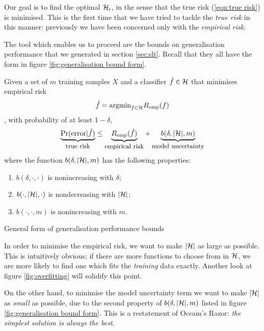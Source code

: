 Our goal is to find the optimal $\mathcal{H}_i$, in the sense that the
true risk (\ref{eqn:true risk}) is minimised.  This is the
first time that we have tried to tackle the \emph{true risk} in this manner:
previously we have been concerned only with the \emph{empirical risk}.

The tool which enables us to proceed are the bounds on generalisation
performance that we generated in section \ref{sec:slt}.  Recall that
they all have the form in figure \ref{fig:generalisation bound form}.

\begin{linefigure}
Given a set of $m$ training samples $X$ and a classifier $\hat{f} \in \mathcal{H}$
that minimises empirical risk
\begin{equation*}
\hat{f} = \mathrm{argmin}_{f \in
\mathcal{H}} R_{\mathrm{emp}}(f)
\end{equation*}
, with probability of at least $1 - \delta$,
%
\begin{equation}
\underbrace{\Pr(\mathrm{error}|\hat{f})}_{\mbox{\small{true risk}}} \leq 
\underbrace{R_{\mathrm{emp}}(\hat{f})}_{\mbox{\small{empirical risk}}} +
\underbrace{b(\delta, |\mathcal{H}|, m)}_{\mbox{\small{model uncertainty}}}
\label{eqn:general bound}
\end{equation}
%
where the function $b(\delta, |\mathcal{H}|, m)$ has the following
properties:
\begin{enumerate}
\item	$b(\delta, \cdot, \cdot)$ is nonincreasing with $\delta$;
\item	$b(\cdot, |\mathcal{H}|, \cdot)$ is nondecreasing with $|\mathcal{H}|$;
\item	$b(\cdot, \cdot, m)$ is nonincreasing with $m$.
\end{enumerate}
\caption{General form of generalisation performance bounds}
\label{fig:generalisation bound form}
\end{linefigure}

In order to minimise the empirical risk, we want to make $|\mathcal{H}|$ as
large as possible.  This is intuitively obvious; if there are more
functions to choose from in $\mathcal{H}$, we are more likely to find one
which fits the \emph{training} data exactly.  Another look at figure
\ref{fig:overfitting} will solidify this point.

On the other hand, to minimise the model uncertainty term we want to make
$|\mathcal{H}|$ as \emph{small} as possible, due to the second property of
$b(\delta, |\mathcal{H}|, m)$ listed in figure \ref{fig:generalisation bound
form}.  This is a restatement of Occam's Razor: \emph{the simplest
solution is always the best}.

